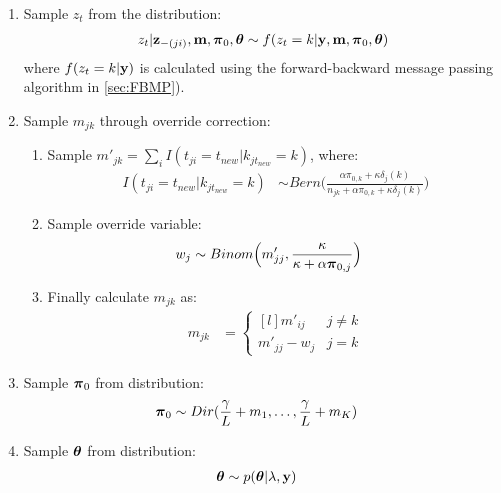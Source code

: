 \documentclass{article} %
\begin{document}
\begin{enumerate}
\item Sample $z_{t}$ from the distribution:
\begin{align*}
z_{t} | {\bf z}_{-(ji)}, {\bf m}, \boldsymbol{\pi}_0, \boldsymbol{\theta} \sim f(z_t=k | {\bf y}, {\bf m}, \boldsymbol{\pi}_0, \boldsymbol{\theta}) 
\end{align*}
where $f(z_t=k | {\bf y})$ is calculated using the forward-backward message passing algorithm in \ref{sec:FBMP}).

\item Sample $m_{jk}$ through override correction:
\begin{enumerate}
\item Sample $m'_{jk} = \sum_{i} I(t_{ji} = t_{new}|k_{jt_{new}} = k)$, where:
\begin{align*}
I(t_{ji} = t_{new}|k_{jt_{new}} = k) & \sim 
Bern \Big(
\frac{\alpha \pi_{0, k} + \kappa \delta_j(k)}
{n_{jk} + \alpha \pi_{0, k} + \kappa \delta_j(k)} \Big) 
\end{align*}
\item Sample override variable: 
\begin{align*}
w_j & \sim 
Binom \Big(m'_{jj}, \frac{\kappa}{\kappa + \alpha\boldsymbol{\pi}_{0, j}} \Big) 
\end{align*}
\item Finally calculate $m_{jk}$ as:
\begin{align*}
m_{jk} &= 
\left\{\begin{matrix*}[l]
m'_{ij} & j \neq k
\\ 
m'_{jj} - w_j & j=k
\end{matrix*}\right.
\end{align*}
\end{enumerate}

\item Sample $\boldsymbol{\pi}_0$ from distribution:
\begin{align*}
\boldsymbol{\pi}_0 & \sim Dir(\frac{\gamma}{L} + m_1, \dots, \frac{\gamma}{L} + m_K)
\end{align*}

\item Sample $\boldsymbol{\theta}$ from distribution:
\begin{align*}
\boldsymbol{\theta} &\sim p(\boldsymbol{\theta} | \lambda, {\bf y})
\end{align*}

\end{enumerate}
\end{document}
